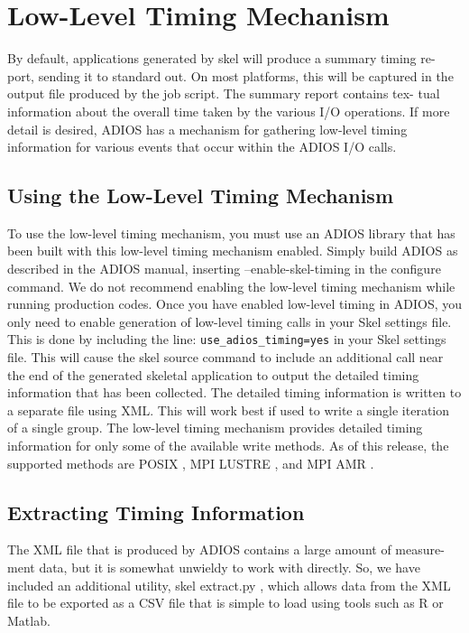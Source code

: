 

\chapter{Low-Level Timing Mechanism}
By default, applications generated by skel will produce a summary timing re-
port, sending it to standard out. On most platforms, this will be captured in
the output file produced by the job script. The summary report contains tex-
tual information about the overall time taken by the various I/O operations. If
more detail is desired, ADIOS has a mechanism for gathering low-level timing
information for various events that occur within the ADIOS I/O calls.

\section{Using the Low-Level Timing Mechanism}
To use the low-level timing mechanism, you must use an ADIOS library that has
been built with this low-level timing mechanism enabled. Simply build ADIOS
as described in the ADIOS manual, inserting
--enable-skel-timing
in the
configure
command. We do not recommend enabling the low-level timing
mechanism while running production codes.
Once you have enabled low-level timing in ADIOS, you only need to enable
generation of low-level timing calls in your Skel settings file. This is done by
including the line:
{\tt use\_adios\_timing=yes}
in your Skel settings file. This will
cause the
skel source
command to include an additional call near the end
of the generated skeletal application to output the detailed timing information
that has been collected. The detailed timing information is written to a separate
file using XML. This will work best if used to write a single iteration of a single
group.
The low-level timing mechanism provides detailed timing information for
only some of the available write methods. As of this release, the supported
methods are
POSIX
,
MPI
LUSTRE
, and
MPI
AMR
.
\section{Extracting Timing Information}
The XML file that is produced by ADIOS contains a large amount of measure-
ment data, but it is somewhat unwieldy to work with directly. So, we have
included an additional utility,
skel
extract.py
, which allows data from the
XML file to be exported as a CSV file that is simple to load using tools such as R or Matlab.
